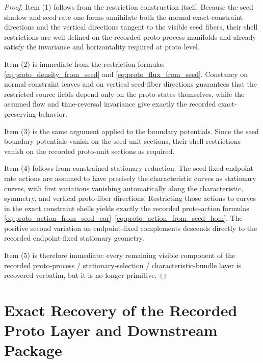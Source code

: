 \documentclass[11pt]{article}
\begin{document}
\begin{proof}
Item (1) follows from the restriction construction itself. Because the seed shadow and seed rate one-forms annihilate both the normal exact-constraint directions and the vertical directions tangent to the visible seed fibers, their shell restrictions are well defined on the recorded proto-process manifolds and already satisfy the invariance and horizontality required at proto level.

Item (2) is immediate from the restriction formulas \eqref{eq:proto_density_from_seed} and \eqref{eq:proto_flux_from_seed}. Constancy on normal constraint leaves and on vertical seed-fiber directions guarantees that the restricted source fields depend only on the proto states themselves, while the assumed flow and time-reversal invariance give exactly the recorded exact-preserving behavior.

Item (3) is the same argument applied to the boundary potentials. Since the seed boundary potentials vanish on the seed unit sections, their shell restrictions vanish on the recorded proto-unit sections as required.

Item (4) follows from constrained stationary reduction. The seed fixed-endpoint rate actions are assumed to have precisely the characteristic curves as stationary curves, with first variations vanishing automatically along the characteristic, symmetry, and vertical proto-fiber directions. Restricting those actions to curves in the exact constraint shells yields exactly the recorded proto-action formulas \eqref{eq:proto_action_from_seed_car}--\eqref{eq:proto_action_from_seed_hom}. The positive second variation on endpoint-fixed complements descends directly to the recorded endpoint-fixed stationary geometry.

Item (5) is therefore immediate: every remaining visible component of the recorded proto-process / stationary-selection / characteristic-bundle layer is recovered verbatim, but it is no longer primitive.
\end{proof}

\section{Exact Recovery of the Recorded Proto Layer and Downstream Package}
\end{document}
